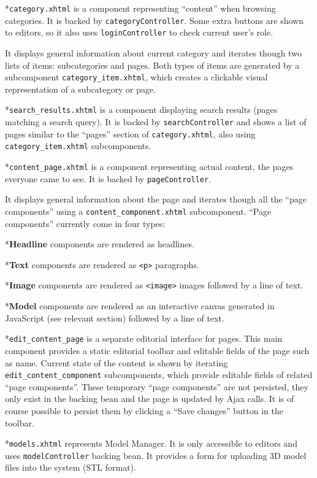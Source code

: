 \begitems

*{\tt category.xhtml} is a component representing “content” when browsing categories. It is backed by {\tt categoryController}. Some extra buttons are shown to editors, so it also uses {\tt loginController} to check current user’s role.

It displays general information about current category and iterates though two lists of items: subcategories and pages. Both types of items are generated by a subcomponent {\tt category\_item.xhtml}, which creates a clickable visual representation of a subcategory or page.

*{\tt search\_results.xhtml} is a component displaying search results (pages matching a search query). It is backed by {\tt searchController} and shows a list of pages similar to the “pages” section of {\tt category.xhtml}, also using {\tt category\_item.xhtml} subcomponents.

*{\tt content\_page.xhtml} is a component representing actual content, the pages everyone came to see. It is backed by {\tt pageController}.

It displays general information about the page and iterates though all the “page components” using a {\tt content\_component.xhtml} subcomponent. “Page components” currently come in four types:

\begitems

*{\bf Headline} components are rendered as {\tt <h3>} headlines.

*{\bf Text} components are rendered as {\tt <p>} paragraphs.

*{\bf Image} components are rendered as {\tt <image>} images followed by a line of text.

*{\bf Model} components are rendered as an interactive canvas generated in JavaScript (see relevant section) followed by a line of text.

\enditems

*{\tt edit\_content\_page} is a separate editorial interface for pages. This main component provides a static editorial toolbar and editable fields of the page such as name. Current state of the content is shown by iterating {\tt edit\_content\_component} subcomponents, which provide editable fields of related “page components”. These temporary “page components” are not persisted, they only exist in the backing bean and the page is updated by Ajax calls. It is of course possible to persist them by clicking a “Save changes” button in the toolbar.

*{\tt models.xhtml} represents Model Manager. It is only accessible to editors and uses {\tt modelController} backing bean.
It provides a form for uploading 3D model files into the system (STL format).


